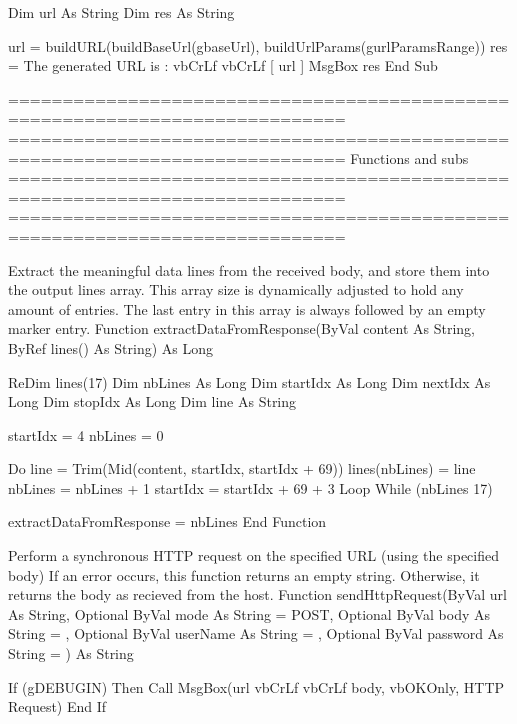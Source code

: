 \documentclass[letterpaper,10pt,english]{sphinxmanual}
\begin{document}
\begin{sphinxVerbatim}[commandchars=\\\{\}]
      Dim url As String
      Dim res As String

      url = buildURL(buildBaseUrl(g\PYGZus{}baseUrl), buildUrlParams(g\PYGZus{}urlParamsRange))
      res = \PYGZdq{}The generated URL is :\PYGZdq{} \PYGZam{} vbCrLf \PYGZam{} vbCrLf \PYGZam{} \PYGZdq{}[\PYGZdq{} \PYGZam{} url \PYGZam{} \PYGZdq{}]\PYGZdq{}
      MsgBox res
End Sub

\PYGZsq{}=============================================================================
\PYGZsq{}=============================================================================
\PYGZsq{}
\PYGZsq{}   Functions and subs
\PYGZsq{}
\PYGZsq{}=============================================================================
\PYGZsq{}=============================================================================

\PYGZsq{} Extract the meaningful data lines from the received body, and store them into
\PYGZsq{} the output lines array. This array size is dynamically adjusted to hold any amount of entries.
\PYGZsq{} The last entry in this array is always followed by an empty marker entry.
\PYGZsq{}
Function extractDataFromResponse(ByVal content As String, ByRef lines() As String) As Long

      ReDim lines(17)
      Dim nbLines As Long
      Dim startIdx As Long
      Dim nextIdx As Long
      Dim stopIdx As Long
      Dim line As String

      startIdx = 4
      nbLines = 0

      Do
            line = Trim(Mid(content, startIdx, startIdx + 69))
            lines(nbLines) = line
            nbLines = nbLines + 1
            startIdx = startIdx + 69 + 3
      Loop While (nbLines \PYGZlt{} 17)

      extractDataFromResponse = nbLines
End Function


\PYGZsq{} Perform a synchronous HTTP request on the specified URL (using the specified body)
\PYGZsq{} If an error occurs, this function returns an empty string.
\PYGZsq{} Otherwise, it returns the body as recieved from the host.
\PYGZsq{}
Function sendHttpRequest(ByVal url As String, \PYGZus{}
      Optional ByVal mode As String = \PYGZdq{}POST\PYGZdq{}, \PYGZus{}
      Optional ByVal body As String = \PYGZdq{}\PYGZdq{}, \PYGZus{}
      Optional ByVal userName As String = \PYGZdq{}\PYGZdq{}, \PYGZus{}
      Optional ByVal password As String = \PYGZdq{}\PYGZdq{}) As String

      If (g\PYGZus{}DEBUG\PYGZus{}IN) Then
            Call MsgBox(url \PYGZam{} vbCrLf \PYGZam{} vbCrLf \PYGZam{} body, vbOKOnly, \PYGZdq{}HTTP Request\PYGZdq{})
      End If


\end{sphinxVerbatim}
\end{document}

